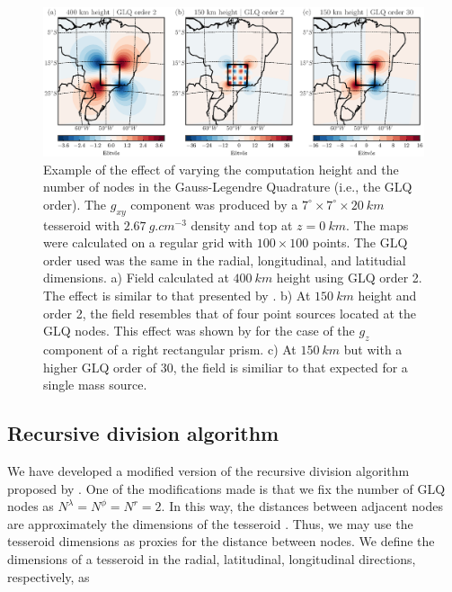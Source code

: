\begin{figure}
    \centering
    \includegraphics[width=\textwidth]{figs/vary-height-and-order}
    \caption{
        Example of the effect of varying
        the computation height
        and the number of nodes in the Gauss-Legendre Quadrature
        (i.e., the GLQ order).
        The $g_{xy}$ component was produced by a
        $7^\circ \times 7^\circ \times 20\ km$ tesseroid
        with $2.67\ g.cm^{-3}$ density
        and top at $z=0\ km$.
        The maps were calculated on a regular grid
        with $100\times100$ points.
        The GLQ order used was the same
        in the radial, longitudinal, and latitudial dimensions.
        a) Field calculated at $400\ km$ height using GLQ order 2.
        The effect is similar to that presented by \citet{Asgharzadeh2007}.
        b) At $150\ km$ height and order 2,
        the field resembles that of
        four point sources located at the GLQ nodes.
        This effect was shown by \citet{Ku1977}
        for the case of the $g_z$ component of a right rectangular prism.
        c) At $150\ km$ but with a higher GLQ order of 30,
        the field is similiar to that expected for a single mass source.
    }
    \label{fig:sample}
\end{figure}


\subsection{Recursive division algorithm}

We have developed a modified version
of the recursive division algorithm proposed by \citet{Li2011}.
One of the modifications made is that
we fix the number of GLQ nodes as
$N^\lambda=N^\phi=N^r=2$.
In this way, the distances between adjacent nodes
are approximately the dimensions of the tesseroid
\citep[see][]{Wild-Pfeiffer2008}.
Thus, we may use the tesseroid dimensions
as proxies for the distance between nodes.
We define the dimensions of a tesseroid
in the radial, latitudinal, longitudinal directions, respectively,
as

